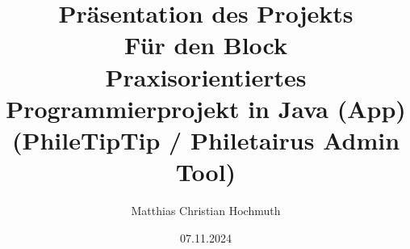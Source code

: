 \title[Präsentation des Projekts]
{\bfseries{Präsentation des Projekts\\
	Für den Block\\
	Praxisorientiertes Programmierprojekt in Java (App)\\
	 (PhileTipTip / Philetairus Admin Tool)}}

\author[Matthias Christian Hochmuth]
{Matthias Christian Hochmuth}

\date{07.11.2024}
